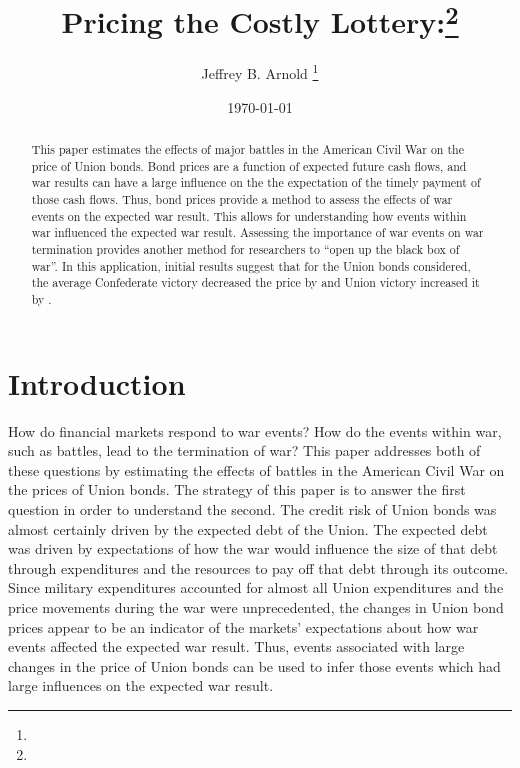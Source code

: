 \documentclass[11pt, oneside, article]{memoir}
\author{Jeffrey B. Arnold \thanks{\affiliations}}
\date{\today{}}
\title{Pricing the Costly Lottery:\thanks{\thanksnote}}
\begin{document}
\begin{titlingpage}
\maketitle{}

\begin{abstract}
\footnotesize
This paper estimates the effects of major battles in the American Civil War on the price of Union bonds.
Bond prices are a function of expected future cash flows, and war results can have a large influence on the the expectation of the timely payment of those cash flows.
Thus, bond prices provide a method to assess the effects of war events on the expected war result.
This allows for understanding how events within war influenced the expected war result.
Assessing the importance of war events on war termination provides another method for researchers to ``open up the black box of war''.
In this application, initial results suggest that for the Union bonds considered, the average Confederate victory decreased the price by \AcwGammaMeanCPct{} and Union victory increased it by \AcwGammaMeanUPct{}.
\end{abstract}

\end{titlingpage}

\section{Introduction}
\label{sec:introduction}

How do financial markets respond to war events?
How do the events within war, such as battles, lead to the termination of war?
This paper addresses both of these questions by estimating the effects of battles in the American Civil War on the prices of Union bonds.
The strategy of this paper is to answer the first question in order to understand the second.
The credit risk of Union bonds was almost certainly driven by the expected debt of the Union.
The expected debt was driven by expectations of how the war would influence the size of that debt through expenditures and the resources to pay off that debt through its outcome.
Since military expenditures accounted for almost all Union expenditures and the price movements during the war were unprecedented, the changes in Union bond prices appear to be an indicator of the markets' expectations about how war events affected the expected war result.
Thus, events associated with large changes in the price of Union bonds can be used to infer those events which had large influences on the expected war result.
\end{document}
